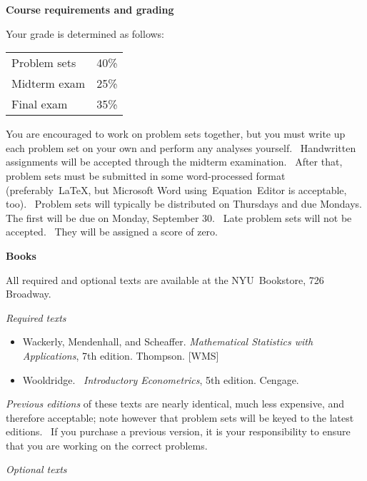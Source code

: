 \documentclass[11pt]{article}
\begin{document}
\bigskip 

\textbf{Course requirements and grading}

\bigskip

Your grade is determined as follows:

\qquad 
\begin{tabular}{ll}
Problem sets & 40\% \\ 
Midterm exam & 25\% \\ 
Final exam & 35\%%
\end{tabular}

\bigskip

You are encouraged to work on problem sets together, but you must write up
each problem set on your own and perform any analyses yourself. \
Handwritten assignments will be accepted through the midterm examination. \
After that, problem sets must be submitted in some word-processed format
(preferably\ LaTeX, but Microsoft Word using\ Equation\ Editor is
acceptable, too). \ Problem sets will typically be distributed on Thursdays
and due Mondays. The first will be due on Monday, September 30. \ Late
problem sets will not be accepted. \ They will be assigned a score of zero.

\bigskip

\newpage

\textbf{Books}

\bigskip

All required and optional texts are available at the NYU\ Bookstore, 726
Broadway.

\bigskip

\textit{Required texts}

\begin{itemize}
\item Wackerly, Mendenhall, and Scheaffer. \textit{Mathematical Statistics
with Applications}, 7th edition. Thompson. [WMS]

\item Wooldridge. \ \textit{Introductory Econometrics}, 5th edition. Cengage.
\end{itemize}

\textit{Previous editions }of these texts are nearly identical, much less
expensive, and therefore acceptable; note however that problem sets will be
keyed to the latest editions. \ If you purchase a previous version, it is
your responsibility to ensure that you are working on the correct problems.

\bigskip

\textit{Optional texts}
\end{document}
